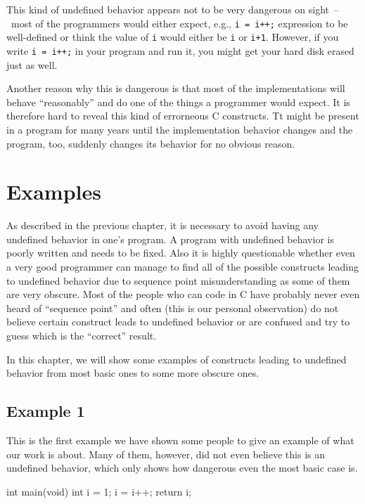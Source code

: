 This kind of undefined behavior appears not to be very dangerous on sight~--~most of the programmers would either expect, e.g., \verb|i = i++;| expression to be well-defined or think the value of \verb|i| would either be \verb|i| or \verb|i+1|.
However, if you write \verb|i = i++;| in your program and run it, you might get your hard disk erased just as well.

Another reason why this is dangerous is that most of the implementations will behave ``reasonably'' and do one of the things a programmer would expect. It is therefore hard to reveal this kind of errorneous C constructs. Tt might be present in a program for many years until the implementation behavior changes and the program, too, suddenly changes its behavior for no obvious reason.

\chapter{Examples}
As described in the previous chapter, it is necessary to avoid having any undefined behavior in one's program. A program with undefined behavior is poorly written and needs to be fixed. Also it is highly questionable whether even a very good programmer can manage to find all of the possible constructs leading to undefined behavior due to sequence point misunderstanding as some of them are very obscure. Most of the people who can code in C have probably never even heard of ``sequence point'' and often (this is our personal observation) do not believe certain construct leads to undefined behavior or are confused and try to guess which is the ``correct'' result.

In this chapter, we will show some examples of constructs leading to undefined behavior from most basic ones to some more obscure ones.

\section{Example 1}\label{example1}
This is the first example we have shown some people to give an example of what our work is about. Many of them, however, did not even believe this is an undefined behavior, which only shows how dangerous even the most basic case is.
\\\begin{code}
int main(void){
	int i = 1;
	i = i++;
	return i;
}
\end{code}

